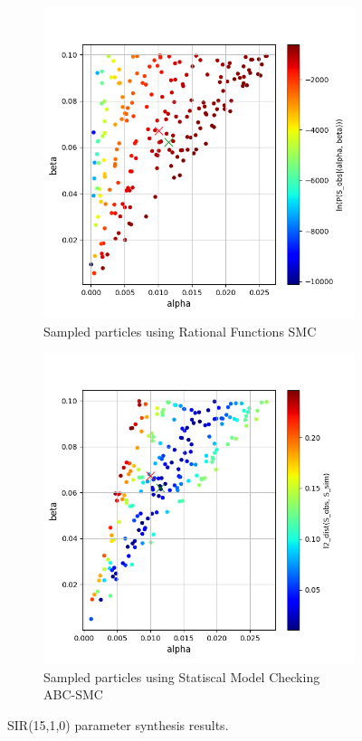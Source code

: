 \begin{figure}[H]
    \centering
    \begin{subfigure}{0.48\textwidth}
        \centering
        \includegraphics[width=\linewidth]{figures/sir1510_rfsmc.png}
        \caption{Sampled particles using Rational Functions SMC}
    \end{subfigure}
    \hfill
    \begin{subfigure}{0.48\textwidth}
        \centering
        \includegraphics[width=\linewidth]{figures/sir1510_abcsmc.png}
        \caption{Sampled particles using Statiscal Model Checking ABC-SMC}
    \end{subfigure}
    \caption{SIR(15,1,0) parameter synthesis results.}
\end{figure}

